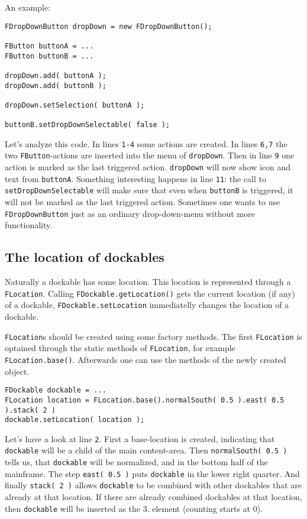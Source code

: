 \documentclass[a4paper,10pt]{article}
\newcommand{\src}[1]{\lstinline[basicstyle=\ttfamily]|#1|}
\begin{document}
An example:
\begin{lstlisting}
FDropDownButton dropDown = new FDropDownButton();

FButton buttonA = ...
FButton buttonB = ...

dropDown.add( buttonA );
dropDown.add( buttonB );

dropDown.setSelection( buttonA );

buttonB.setDropDownSelectable( false );
\end{lstlisting}
Let's analyze this code. In lines \src{1-4} some actions are created. In lines \src{6,7} the two \src{FButton}-actions are inserted into the menu of \src{dropDown}. Then in line \src{9} one action is marked as the last triggered action. \src{dropDown} will now show icon and text from \src{buttonA}. Something interesting happens in line \src{11}: the call to \src{setDropDownSelectable} will make sure that even when \src{buttonB} is triggered, it will not be marked as the last triggered action. Sometimes one wants to use \src{FDropDownButton} just as an ordinary drop-down-menu without more functionality.

\subsection{The location of dockables}
Naturally a dockable has some location. This location is represented through a \src{FLocation}. Calling \src{FDockable.getLocation()} gets the current location (if any) of a dockable, \src{FDockable.setLocation} immediatelly changes the location of a dockable.

\src{FLocation}s should be created using some factory methods. The first \src{FLocation} is optained through the static methods of \src{FLocation}, for example \src{FLocation.base()}. Afterwards one can use the methods of the newly created object.
\begin{lstlisting}
FDockable dockable = ...
FLocation location = FLocation.base().normalSouth( 0.5 ).east( 0.5 ).stack( 2 )
dockable.setLocation( location );
\end{lstlisting}
Let's have a look at line \src{2}. First a base-location is created, indicating that \src{dockable} will be a child of the main content-area. Then \src{normalSouth( 0.5 )} tells us, that \src{dockable} will be normalized, and in the bottom half of the mainframe. The step \src{east( 0.5 )} puts \src{dockable} in the lower right quarter. And finally \src{stack( 2 )} allows \src{dockable} to be combined with other dockables that are already at that location. If there are already combined dockables at that location, then \src{dockable} will be inserted as the 3. element (counting starts at 0).
\end{document}

